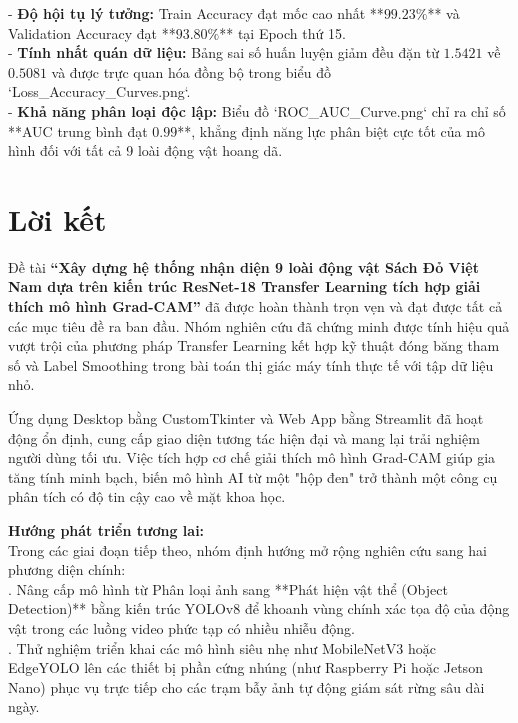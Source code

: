 \documentclass[12pt,a4paper]{report}
\begin{document}
\noindent - \textbf{Độ hội tụ lý tưởng:} Train Accuracy đạt mốc cao nhất **$99.23\%$** và Validation Accuracy đạt **$93.80\%$** tại Epoch thứ 15.\\[0.15cm]
\noindent - \textbf{Tính nhất quán dữ liệu:} Bảng sai số huấn luyện giảm đều đặn từ $1.5421$ về $0.5081$ và được trực quan hóa đồng bộ trong biểu đồ `Loss_Accuracy_Curves.png`.\\[0.15cm]
\noindent - \textbf{Khả năng phân loại độc lập:} Biểu đồ `ROC_AUC_Curve.png` chỉ ra chỉ số **AUC trung bình đạt $0.99$**, khẳng định năng lực phân biệt cực tốt của mô hình đối với tất cả 9 loài động vật hoang dã.
\newpage

\chapter*{Lời kết}
Đề tài \textbf{“Xây dựng hệ thống nhận diện 9 loài động vật Sách Đỏ Việt Nam dựa trên kiến trúc ResNet-18 Transfer Learning tích hợp giải thích mô hình Grad-CAM”} đã được hoàn thành trọn vẹn và đạt được tất cả các mục tiêu đề ra ban đầu. Nhóm nghiên cứu đã chứng minh được tính hiệu quả vượt trội của phương pháp Transfer Learning kết hợp kỹ thuật đóng băng tham số và Label Smoothing trong bài toán thị giác máy tính thực tế với tập dữ liệu nhỏ.

Ứng dụng Desktop bằng CustomTkinter và Web App bằng Streamlit đã hoạt động ổn định, cung cấp giao diện tương tác hiện đại và mang lại trải nghiệm người dùng tối ưu. Việc tích hợp cơ chế giải thích mô hình Grad-CAM giúp gia tăng tính minh bạch, biến mô hình AI từ một "hộp đen" trở thành một công cụ phân tích có độ tin cậy cao về mặt khoa học.

\textbf{Hướng phát triển tương lai:}\\
Trong các giai đoạn tiếp theo, nhóm định hướng mở rộng nghiên cứu sang hai phương diện chính:\\

. Nâng cấp mô hình từ Phân loại ảnh sang **Phát hiện vật thể (Object Detection)** bằng kiến trúc YOLOv8 để khoanh vùng chính xác tọa độ của động vật trong các luồng video phức tạp có nhiều nhiễu động.\\[0.15cm]
. Thử nghiệm triển khai các mô hình siêu nhẹ như MobileNetV3 hoặc EdgeYOLO lên các thiết bị phần cứng nhúng (như Raspberry Pi hoặc Jetson Nano) phục vụ trực tiếp cho các trạm bẫy ảnh tự động giám sát rừng sâu dài ngày.
\end{document}

